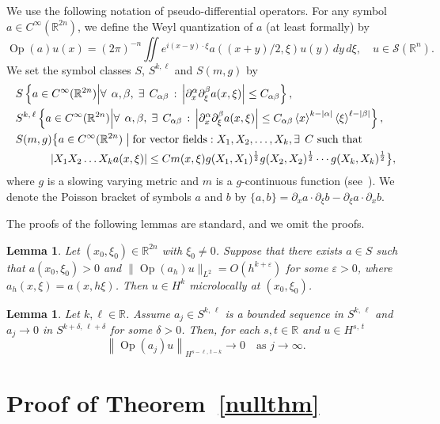 \documentclass[10pt]{amsart}
\newtheorem{lemm}[cdrthm]{Lemma}
\theoremstyle{definition}
\let\coloneqq\relax
\renewcommand*\a{\alpha}
\renewcommand*\b{\beta}
\renewcommand*\d{\delta}
\newcommand*\e{\varepsilon}
\newcommand*\x{\xi}
\DeclareMathOperator{\Op}{Op}
\newcommand*\re{\mathbb{R}}
\newcommand{\clS}{\mathcal{S}}
\newcommand*\pa{\partial}
\newcommand*\coloneqq{\mathrel{\mathop:}=}
\newcommand{\jap}[1]{\left\langle #1 \right\rangle}
\newcommand{\bigset}[2]{\bigl\{#1\bigm|#2\bigr\}}
\let\oldexists\exists
\renewcommand*{\exists}{\mathrel{\oldexists}}
\let\oldforall\forall
\renewcommand*{\forall}{\mathrel{\oldforall}}
\begin{document}
We use the following notation of pseudo-differential operators. For any symbol $a\in C^{\infty}(\re^{2n})$, we define the Weyl quantization of $a$ (at least formally) by
\[
\Op(a) u(x) =(2\pi)^{-n} \iint e^{i(x-y)\cdot\x} a((x+y)/2,\x) u(y) \,dy\,d\x, \quad u\in\clS(\re^n).
\]
We set the symbol classes $S$, $S^{k,\ell}$ and $S(m,g)$ by
\begin{align*}
&S \coloneqq \left\{a\in C^{\infty}(\re^{2n})\middle|\forall\,\a, \b,\;\exists\, C_{\a\b} \, :\, \left|\pa_x^{\a}\pa_{\x}^{\b}a(x,\x)\right| \leq C_{\a\b}\right\},\\
&S^{k,\,\ell} \coloneqq \left\{a\in C^{\infty}(\re^{2n})\middle|\forall\,\a, \b,\;\exists\, C_{\a\b} \,:\, \left|\pa_x^{\a}\pa_{\x}^{\b}a(x,\x)\right| \leq C_{\a\b}\jap{x}^{k-|\a|}\jap{\x}^{\ell-|\b|}\right\},\\
& S(m,g) \coloneqq \bigset{a\in C^{\infty}(\re^{2n})}{\text{for vector fields}: X_1,X_2,\dots,X_k,
\exists\, C \text{ such that}\\
& \qquad\quad \left|X_1X_2\dots X_ka(x,\x)\right| \leq Cm(x,\x)g(X_1,X_1)^{\frac{1}{2}}g(X_2,X_2)^{\frac{1}{2}}\cdots g(X_k,X_k)^{\frac{1}{2}}},
\end{align*}
where $g$ is a slowing varying metric and $m$ is a $g$-continuous function (see~\cite[Section~18.4]{Ho}). We denote the Poisson bracket of symbols $a$ and $b$ by $\{a,b\}=\pa_x a\cdot\pa_\x b -\pa_\x a\cdot\pa_x b$.


The proofs of the following lemmas are standard, and we omit the proofs.

\begin{lemm}\label{propwf}
Let $(x_0, \x_0)\in \re^{2n}$ with $\x_0 \neq 0$. Suppose that there exists $a\in S$ such that $a(x_0, \x_0)>0$ and $\| \Op(a_h)u \|_{L^2} = O(h^{k+\e})$ for some $\e>0$, where $a_h(x,\x)=a(x,h\x)$. Then $u\in H^k$ microlocally at $(x_0,\x_0)$.
\end{lemm}


\begin{lemm}\label{convergence}
Let $k,\ell\in \re$. Assume $a_j\in S^{k,\,\ell}$ is a bounded sequence in $ S^{k,\,\ell}$ and $a_j\to 0$ in $S^{k+\d,\,\ell+\d}$ for some $\d>0$. Then, for each $s, t\in \re$ and $u\in H^{s,\,t}$
\[
\left\|\Op(a_j)u\right\|_{H^{s-\ell,\,t-k}}\to 0\quad\text{as } j\to \infty.
\]
\end{lemm}



\section{Proof of Theorem~\ref{nullthm}}\label{section-proof}
\end{document}
